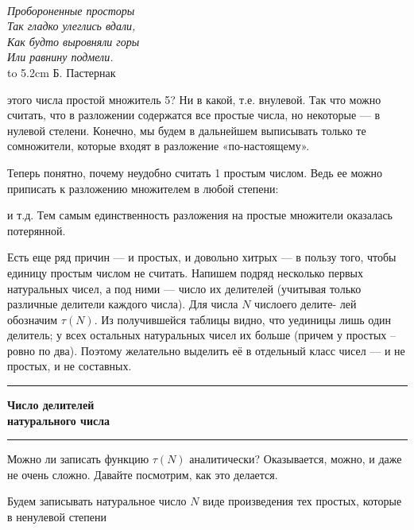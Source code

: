 \begin{multicols}{3}
		
		\columnbreak
		
		\begin{ramka}{0.296\textwidth}
			\\
			\textit{\large Пробороненные просторы} \\
			\textit{\large Так гладко улеглись вдали,}\\
			\textit{\large Как будто выровняли горы}\\
			\textit{\large Или равнину подмели.} \\[3 pt]
			\hbox to 5.2cm {\hfil Б. Пастернак}
		\end{ramka}
	
		\noindent
		 этого числа простой множитель 5? Ни в какой, т.е. внулевой. Так что можно
		 считать, что в разложении содержатся все простые числа, но некоторые — в
		 нулевой стелени. Конечно, мы будем в дальнейшем выписывать только те
		 сомножители, которые входят в разложение «по-настоящему».
		 
		 Теперь понятно, почему неудобно считать 1 простым числом. Ведь ее
		 можно приписать к разложению множителем в любой степени:

		\noindent
		и т.д. Тем самым единственность разложения на простые множители оказалась потерянной.
		
		Есть еще ряд причин — и простых, и довольно хитрых — в пользу того,
		чтобы единицу простым числом не считать. Напишем подряд несколько
		первых натуральных чисел, а под ними — число их делителей (учитывая
		только различные делители каждого числа). Для числа $N$ числоего делите-
		лей обозначим $\tau(N)$. Из получившейся таблицы видно, что уединицы лишь один делитель; у всех остальных натуральных чисел их больше (причем у
		простых -- ровно по два). Поэтому желательно выделить её в отдельный
		класс чисел — и не простых, и не составных.
		
		\bigskip
		\hrule\smallskip
		{\bfseries \large \noindent Число делителей\\ натурального числа}
		\smallskip\hrule\smallskip

		Можно ли записать функцию $\tau(N)$ аналитически? Оказывается, можно,
		и даже не очень сложно. Давайте посмотрим, как это делается.
		
		Будем записывать натуральное число $N$ виде произведения тех простых, которые в ненулевой степени
		
		\rule{0pt}{4 em}


\end{multicols}
